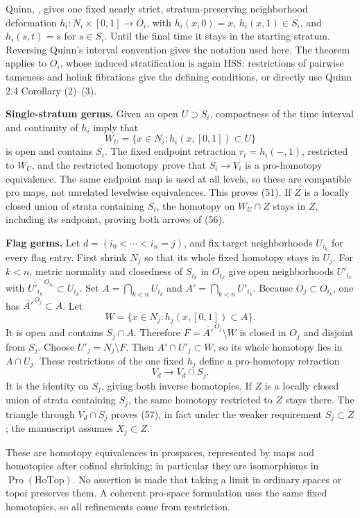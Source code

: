Quinn, \cite[Proposition 3.2, p.469]{Quinn1988}, gives one fixed nearly strict, stratum-preserving neighborhood deformation \(h_i:N_i\times[0,1]\to O_i\), with \(h_i(x,0)=x\), \(h_i(x,1)\in S_i\), and \(h_i(s,t)=s\) for \(s\in S_i\). Until the final time it stays in the starting stratum. Reversing Quinn's interval convention gives the notation used here. The theorem applies to \(O_i\), whose induced stratification is again HSS: restrictions of pairwise tameness and holink fibrations give the defining conditions, or directly use Quinn 2.4 Corollary (2)--(3).

\textbf{Single-stratum germs.} Given an open \(U\supset S_i\), compactness of the time interval and continuity of \(h_i\) imply that \[
 W_U=\{x\in N_i:h_i(x,[0,1])\subset U\}
\] is open and contains \(S_i\). The fixed endpoint retraction \(r_i=h_i(-,1)\), restricted to \(W_U\), and the restricted homotopy prove that \(S_i\to V_i\) is a pro-homotopy equivalence. The same endpoint map is used at all levels, so these are compatible pro maps, not unrelated levelwise equivalences. This proves (51). If \(Z\) is a locally closed union of strata containing \(S_i\), the homotopy on \(W_U\cap Z\) stays in \(Z\), including its endpoint, proving both arrows of (56).

\textbf{Flag germs.} Let \(d=(i_0<\cdots<i_n=j)\), and fix target neighborhoods \(U_{i_k}\) for every flag entry. First shrink \(N_j\) so that its whole fixed homotopy stays in \(U_j\). For \(k<n\), metric normality and closedness of \(S_{i_k}\) in \(O_{i_k}\) give open neighborhoods \(U'_{i_k}\) with \(\overline{U'_{i_k}}^{\,O_{i_k}}\subset U_{i_k}\). Set \(A=\bigcap_{k<n}U_{i_k}\) and \(A'=\bigcap_{k<n}U'_{i_k}\). Because \(O_j\subset O_{i_k}\), one has \(\overline{A'}^{\,O_j}\subset A\). Let \[
 W=\{x\in N_j:h_j(x,[0,1])\subset A\}.
\] It is open and contains \(S_j\cap A\). Therefore \(F=\overline{A'}^{\,O_j}\setminus W\) is closed in \(O_j\) and disjoint from \(S_j\). Choose \(U'_j=N_j\setminus F\). Then \(A'\cap U'_j\subset W\), so its whole homotopy lies in \(A\cap U_j\). These restrictions of the one fixed \(h_j\) define a pro-homotopy retraction \[
 V_d\longrightarrow V_d\cap S_j.
\] It is the identity on \(S_j\), giving both inverse homotopies. If \(Z\) is a locally closed union of strata containing \(S_j\), the same homotopy restricted to \(Z\) stays there. The triangle through \(V_d\cap S_j\) proves (57), in fact under the weaker requirement \(S_j\subset Z\); the manuscript assumes \(X_j\subset Z\).

These are homotopy equivalences in prospaces, represented by maps and homotopies after cofinal shrinking; in particular they are isomorphisms in \(\operatorname{Pro}(\mathrm{HoTop})\). No assertion is made that taking a limit in ordinary spaces or topoi preserves them. A coherent pro-space formulation uses the same fixed homotopies, so all refinements come from restriction.

